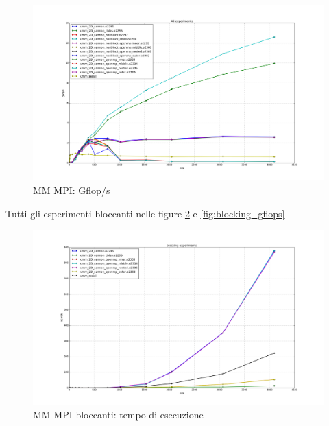 \begin{figure}[htbp]
    \begin{center}
        \includegraphics[width=15cm]{immagini/all_gflops.png}
    \end{center}
    \caption{MM MPI: Gflop/s}
    \label{fig:all_gflops}
\end{figure}

Tutti gli esperimenti bloccanti nelle figure \ref{fig:blocking_times} e \ref{fig:blocking_gflops}

\begin{figure}[htbp]
    \begin{center}
        \includegraphics[width=15cm]{immagini/blocking_times.png}
    \end{center}
    \caption{MM MPI bloccanti: tempo di esecuzione}
    \label{fig:blocking_times}
\end{figure}

